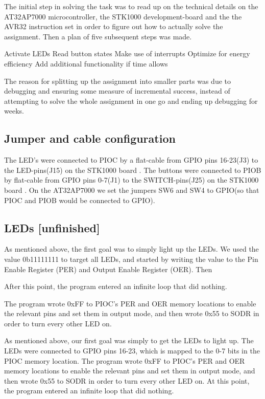 The initial step in solving the task was to read up on the technical details on the AT32AP7000 microcontroller, the STK1000 development-board and the the AVR32 instruction set in order to figure out how to actually solve the assignment. Then a plan of five subsequent steps was made.

Activate LEDs
Read button states
Make use of interrupts
Optimize for energy efficiency
Add additional functionality if time allows

The reason for splitting up the assignment into smaller parts was due to debugging and ensuring some measure of incremental success, instead of attempting to solve the whole assignment in one go and ending up debugging for weeks.

\subsection{Jumper and cable configuration}


The LED’s were connected to PIOC by a flat-cable from GPIO pins 16-23(J3) to the LED-pins(J15) on the STK1000 board \cite[section~2.4.1]{kompendium}. 
The buttons were connected to PIOB by flat-cable from GPIO pins 0-7(J1) to the SWITCH-pins(J25) on the STK1000 board \cite[section~2.4.1]{kompendium}.
On the AT32AP7000 we set the jumpers SW6 and SW4 to GPIO(so that PIOC and PIOB would be connected to GPIO)\cite[table~2.3]{kompendium}.

\subsection{LEDs [unfinished]}

As mentioned above, the first goal was to simply light up the LEDs. We used the value 0b11111111 to target all LEDs, and started by writing the value to the Pin Enable Register (PER) and Output Enable Register (OER). Then 

After this point, the program entered an infinite loop that did nothing.

The program wrote 0xFF to PIOC’s PER and OER memory locations to enable the relevant pins and set them in output mode, and then wrote 0x55 to SODR in order to turn every other LED on. 


As mentioned above, our first goal was simply to get the LEDs to light up. The LEDs were connected to GPIO pins 16-23, which is mapped to the 0-7 bits in the PIOC memory location. 
The program wrote 0xFF to PIOC’s PER and OER memory locations to enable the relevant pins and set them in output mode, and then wrote 0x55 to SODR in order to turn every other LED on. At this point, the program entered an infinite loop that did nothing.



